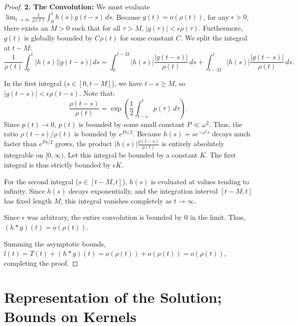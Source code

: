 \documentclass[10pt,reqno]{amsart}
\theoremstyle{definition}
\begin{document}
\begin{proof}
			\textbf{2. The Convolution:}
			We must evaluate $\lim_{t \to \infty} \frac{1}{\rho(t)} \int_0^t h(s) g(t-s) \, ds$.
			Because $g(t) = o(\rho(t))$, for any $\epsilon > 0$, there exists an $M > 0$ such that for all $\tau > M$, $|g(\tau)| < \epsilon \rho(\tau)$. Furthermore, $g(t)$ is globally bounded by $C \rho(t)$ for some constant $C$.
			We split the integral at $t-M$:
			\[ \frac{1}{\rho(t)} \int_0^t |h(s)| |g(t-s)| \, ds = \int_0^{t-M} |h(s)| \frac{|g(t-s)|}{\rho(t)} \, ds + \int_{t-M}^t |h(s)| \frac{|g(t-s)|}{\rho(t)} \, ds. \]
			
			In the first integral ($s \in [0, t-M]$), we have $t-s \ge M$, so $|g(t-s)| < \epsilon \rho(t-s)$. Note that:
			\[ \frac{\rho(t-s)}{\rho(t)} = \exp\left( \frac{1}{2}\int_{t-s}^t p(\tau)\,d\tau \right). \]
			Since $p(t) \to 0$, $p(t)$ is bounded by some small constant $P \ll \omega^2$. Thus, the ratio $\rho(t-s)/\rho(t)$ is bounded by $e^{Ps/2}$. Because $h(s) = s e^{-\omega^2 s}$ decays much faster than $e^{Ps/2}$ grows, the product $|h(s)|\frac{\rho(t-s)}{\rho(t)}$ is entirely absolutely integrable on $[0, \infty)$. Let this integral be bounded by a constant $K$. The first integral is thus strictly bounded by $\epsilon K$.
			
			For the second integral ($s \in [t-M, t]$), $h(s)$ is evaluated at values tending to infinity. Since $h(s)$ decays exponentially, and the integration interval $[t-M, t]$ has fixed length $M$, this integral vanishes completely as $t \to \infty$.
			
			Since $\epsilon$ was arbitrary, the entire convolution is bounded by $0$ in the limit. Thus, $(h * g)(t) = o(\rho(t))$.
			
			Summing the asymptotic bounds, $l(t) = T(t) + (h * g)(t) = o(\rho(t)) + o(\rho(t)) = o(\rho(t))$, completing the proof.
	\end{proof}
	
	\section{Representation of the Solution; Bounds on Kernels}
	
\end{document}
